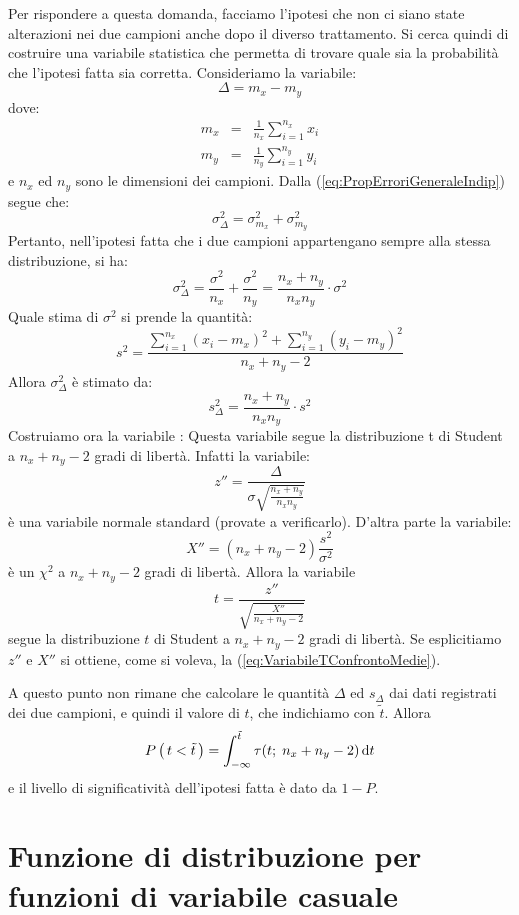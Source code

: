 Per rispondere a questa domanda, facciamo l'ipotesi che non ci siano
state alterazioni nei due campioni anche dopo il diverso trattamento.
Si cerca quindi di costruire una variabile statistica che  permetta di trovare
quale sia la probabilit\`a che l'ipotesi fatta sia corretta.
Consideriamo la variabile:
$$
\Delta = m_x - m_y
$$
dove:
\begin{eqnarray*}
m_x &=& \frac{1}{n_x} \sum_{i=1}^{n_x} x_i\\
m_y &=& \frac{1}{n_y} \sum_{i=1}^{n_y} y_i
\end{eqnarray*}
e $n_x$ ed $n_y$ sono le dimensioni dei campioni.
Dalla (\ref{eq:PropErroriGeneraleIndip}) segue che:
$$
\sigma_{\Delta}^2 = \sigma_{m_x}^2 + \sigma_{m_y}^2
$$
Pertanto, nell'ipotesi fatta che i due campioni appartengano sempre alla stessa
distribuzione, si ha:
$$
\sigma_{\Delta}^2 = \frac{\sigma^2}{n_x}+\frac{\sigma^2}{n_y}=
\frac{n_x + n_y}{n_x n_y} \cdot \sigma^2
$$
Quale stima di $\sigma^2$ si prende la quantit\`a:
$$
s^2=\frac{\displaystyle \sum_{i=1}^{n_x}(x_i-m_x)^2
+ \sum_{i=1}^{n_y}(y_i-m_y)^2}{\displaystyle n_x + n_y -2}
$$
Allora $\sigma_{\Delta}^2$ \`e stimato da:
$$
s_{\Delta}^2 = \frac{n_x + n_y}{n_x n_y} \cdot s^2
$$
Costruiamo ora la variabile :
Questa variabile segue la distribuzione t di Student a $n_x + n_y - 2$
gradi di libert\`a. Infatti la variabile:
$$
z''=\frac{\Delta}{\sigma \sqrt{\frac{n_x + n_y}{n_x n_y}}}
$$
\`e una variabile normale standard (provate a verificarlo).
D'altra parte la variabile:
$$
X''=(n_x + n_y - 2)\frac{s^2}{\sigma^2}
$$
\`e un $\chi^2$ a $n_x + n_y - 2$ gradi di libert\`a.
Allora la variabile
$$
t=\frac{z''}{\sqrt{\frac{X''}{n_x + n_y - 2}}}
$$
segue la distribuzione $t$ di Student a $n_x + n_y - 2$ gradi di
libert\`a. Se esplicitiamo $z''$ e $X''$ si ottiene, come si voleva,
la (\ref{eq:VariabileTConfrontoMedie}).

A questo punto non rimane che calcolare le quantit\`a $\Delta$ ed
$s_{\Delta}$ dai dati registrati dei due campioni, e quindi il valore
di $t$, che indichiamo con $\tilde{t}$. Allora
$$
\prob{t<\tilde{t}} = \dintegral{\tpdf{t}{n_x + n_y - 2}}{t}{-\infty}{\tilde{t}}
$$
e il livello di significativit\`a dell'ipotesi fatta \`e dato da $1-P$.


\section{Funzione di distribuzione per funzioni di variabile casuale}

